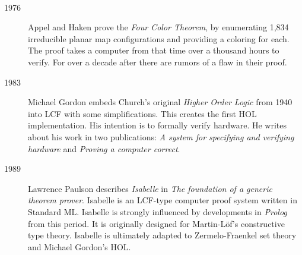 \documentclass{beamer}
\begin{document}
\begin{frame}[allowframebreaks]{\insertsectionhead\ \textemdash\
    \insertsubsectionhead}
\begin{description}
  \item[1976] Appel and Haken prove the \emph{Four Color Theorem}, by
    enumerating 1,834 irreducible planar map configurations and
    providing a coloring for each.  The proof takes a computer from
    that time over a thousand hours to verify. For over a decade
    after there are rumors of a flaw in their proof.
  \item[1983] Michael Gordon embeds Church's original \emph{Higher Order Logic} from 1940 into LCF with some simplifications. This creates the first HOL implementation. His intention is to formally verify hardware.  He writes about his work in two publications: \emph{A system for specifying and verifying hardware} and \emph{Proving a computer correct}.
  \item[1989] Lawrence Paulson describes \emph{Isabelle} in \emph{The
      foundation of a generic theorem prover}.  Isabelle is an
    LCF-type computer proof system written in Standard ML. Isabelle is
    strongly influenced by developments in \emph{Prolog} from this
    period. It is originally designed for Martin-L\"of's constructive
    type theory. Isabelle is ultimately adapted to
    Zermelo-Fraenkel set theory and Michael Gordon's HOL.
  \end{description}
\end{frame}



\end{document}
